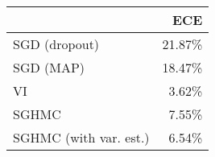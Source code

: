 \begin{tabular}{lr}
\toprule
{} &    ECE \\
\midrule
SGD (dropout)          & 21.87\% \\
SGD (MAP)              & 18.47\% \\
VI                     &  3.62\% \\
SGHMC                  &  7.55\% \\
SGHMC (with var. est.) &  6.54\% \\
\bottomrule
\end{tabular}
